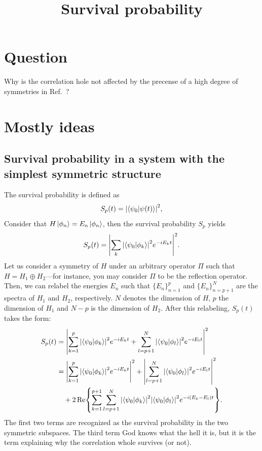 \documentclass[10pt,a4paper]{article}
\title{Survival probability}
\begin{document}
\maketitle
\tableofcontents

\listoftodos

\pagebreak

\section{Question}
Why is the correlation hole not affected by the precense of a high degree
of symmetries in Ref.~\cite{delacruz_2020_quantum}?

\section{Mostly ideas}
\subsection{Survival probability in a system with the simplest symmetric structure}
The survival probability is defined as 
\begin{equation}
S_p(t)
= 
\abs{\braket{\psi_0}{\psi(t)}}^2,
\end{equation}
Consider that $H \ket{\phi_n} = E_n \ket{\phi_n}$, then the survival probability
$S_p$ yields
\begin{equation}
S_p(t) 
= 
\abs{
\sum_{k}
\abs{\braket{\psi_0}{\phi_k}}^2
e^{-i E_k t}
}^2.
\end{equation}
Let us consider a symmetry of $H$ under an arbitrary operator $\Pi$ such 
that $H = H_1 \oplus H_2$---for instance, you may consider $\Pi$ to be the 
reflection operator. Then, we can relabel the energies $E_n$ such that 
$\{E_n\}_{n=1}^p$ and $\{E_n\}_{n=p+1}^N$ are the spectra of $H_1$ and 
$H_2$, respectively. $N$ denotes the dimension of $H$, $p$ the dimension of 
$H_1$ and $N-p$ is the dimension of $H_2$. After this relabeling, $S_p(t)$
takes the form:
\begin{align}
S_p(t) 
&=
\abs{
\sum_{k = 1}^p
\abs{\braket{\psi_0}{\phi_k}}^2
e^{-i E_k t}
+
\sum_{l = p+1}^N
\abs{\braket{\psi_0}{\phi_l}}^2
e^{-i E_l t}
}^2 \\
%
&= 
\abs{
\sum_{k = 1}^p
\abs{\braket{\psi_0}{\phi_k}}^2
e^{-i E_k t}
}^2 
+
\abs{
\sum_{l = p+1}^N
\abs{\braket{\psi_0}{\phi_l}}^2
e^{-i E_l t}
}^2 \\
&\quad +
2\Re{
\sum_{k=1}^{p+1}\sum_{l = p+1}^N
\abs{\braket{\psi_0}{\phi_k}}^2
\abs{\braket{\psi_0}{\phi_l}}^2
e^{-i(E_k - E_l) t}
}.
\end{align}
The first two terms are recognized as the survival probability in the two
symmetric subspaces. The third term God knows what the hell it is, but it 
is the term explaining why the correlation whole survives (or not).
\end{document}
